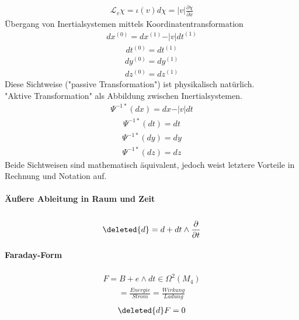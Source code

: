 \documentclass[10pt,a4paper]{article}
\begin{document}
\begin{align}
\mathcal{L}_v \chi = \iota (v) d \chi = \vert v \vert \frac{\partial \chi}{\partial x}
\end{align}
Übergang von Inertialsystemen mittels Koordinatentransformation
\begin{align}
dx^{(0)}=dx^{(1)}-\vert v \vert dt^{(1)}
\end{align}
\begin{align}
dt^{(0)}= dt^{(1)}
\end{align}
\begin{align}
dy^{(0)}= dy^{(1)}
\end{align}
\begin{align}
dz^{(0)}= dz^{(1)}
\end{align}
Diese Sichtweise ("passive Transformation") ist physikalisch natürlich.\\
"Aktive Transformation" als Abbildung zwischen Inertialsystemen.
\begin{align}
\Psi^{-1*} (dx) =dx- \vert v \vert dt
\end{align}
\begin{align}
\Psi^{-1*}(dt)=dt
\end{align}
\begin{align}
\Psi^{-1*}(dy)=dy
\end{align}
\begin{align}
\Psi^{-1*}(dz)=dz
\end{align}
Beide Sichtweisen sind mathematisch äquivalent, jedoch weist letztere Vorteile in Rechnung und Notation auf.
\paragraph{Äußere Ableitung in Raum und Zeit} $\,$ \\
\begin{align}
\deleted{d}= d+ dt \wedge \frac{\partial}{\partial t}
\end{align}
\paragraph{Faraday-Form} $\, $ \\
\begin{align}
F= B+ e \wedge dt \in \Omega ^2 (M_4)
\end{align}
\begin{align}
[F]=\frac{Energie}{Strom} = \frac{Wirkung}{Ladung}
\end{align}
\begin{align}
\deleted{d}F=0
\end{align}
\end{document}
